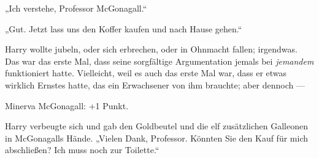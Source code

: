 „Ich verstehe, Professor McGonagall.“

„Gut. Jetzt lass uns den Koffer kaufen und nach Hause gehen.“

Harry wollte jubeln, oder sich erbrechen, oder in Ohnmacht fallen; irgendwas. Das war das erste Mal, dass seine sorgfältige Argumentation jemals bei \emph{jemandem} funktioniert hatte. Vielleicht, weil es auch das erste Mal war, dass er etwas wirklich Ernstes hatte, das ein Erwachsener von ihm brauchte; aber dennoch —

Minerva McGonagall: +1 Punkt.

Harry verbeugte sich und gab den Goldbeutel und die elf zusätzlichen Galleonen in McGonagalls Hände.
„Vielen Dank, Professor. Könnten Sie den Kauf für mich abschließen? Ich muss noch zur Toilette.“

